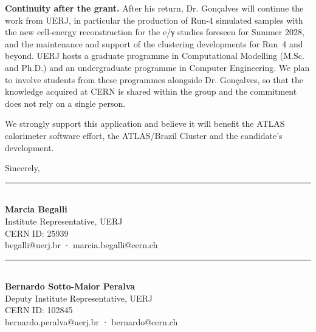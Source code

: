 \documentclass[11pt,a4paper]{article}
\newcommand{\signature}[4]{%
  \begin{minipage}[t]{0.46\linewidth}
    \vspace{1.4cm}
    \rule{\linewidth}{0.4pt}\\[0.2em]
    \textbf{#1}\\
    {\small #2, UERJ\\ CERN ID: #3\\ #4}
  \end{minipage}%
}
\begin{document}
\textbf{Continuity after the grant.} After his return, Dr. Gonçalves will continue the work from UERJ, in particular the production of Run-4 simulated samples with the new cell-energy reconstruction for the e/γ studies foreseen for Summer 2028, and the maintenance and support of the clustering developments for Run~4 and beyond. UERJ hosts a graduate programme in Computational Modelling (M.Sc. and Ph.D.) and an undergraduate programme in Computer Engineering. We plan to involve students from these programmes alongside Dr. Gonçalves, so that the knowledge acquired at CERN is shared within the group and the commitment does not rely on a single person.

We strongly support this application and believe it will benefit the ATLAS calorimeter software effort, the ATLAS/Brazil Cluster and the candidate's development.

Sincerely,

\noindent
\signature{Marcia Begalli}{Institute Representative}{25939}{begalli@uerj.br · marcia.begalli@cern.ch}%
\hfill
\signature{Bernardo Sotto-Maior Peralva}{Deputy Institute Representative}{102845}{bernardo.peralva@uerj.br · bernardo@cern.ch}
\end{document}
